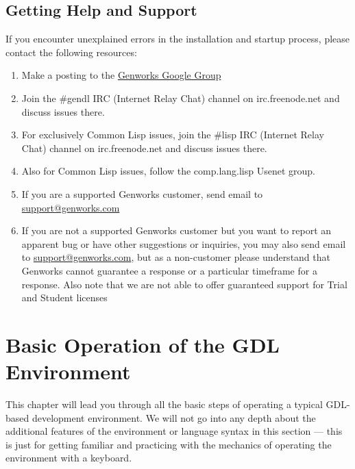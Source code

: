 \documentclass [11pt]{book}
\begin{document}
\section{Getting Help and Support}

\label{sec:gettinghelpandsupport}

If you encounter unexplained errors in the installation and
startup process, please contact the following resources:

\begin{enumerate}

\item Make a posting to the \href{http://groups.google.com/group/genworks}{Genworks Google Group}

\item Join the \#gendl IRC (Internet Relay Chat) channel on
	irc.freenode.net and discuss issues there.

\item For exclusively Common Lisp issues, join the \#lisp
	IRC (Internet Relay Chat) channel on irc.freenode.net and
	discuss issues there.

\item Also for Common Lisp issues, follow the comp.lang.lisp
	Usenet group.

\item If you are a supported Genworks customer, send email to \href{mailto:support@genworks.com}{support@genworks.com}

\item If you are not a supported Genworks customer but you want to report an apparent bug or have other suggestions or inquiries, you may also send email to \href{mailto:support@genworks.com}{support@genworks.com}, but as a non-customer please understand that Genworks
	  cannot guarantee a response or a particular timeframe for a
	  response. Also note that we are not able to offer guaranteed
	  support for Trial and Student licenses 

\end{enumerate}



\chapter{Basic Operation of the GDL Environment}

\label{chap:basicoperationofthegdlenvironment}

This chapter will lead you through all the basic steps of
operating a typical GDL-based development environment. We will not go
into any depth about the additional features of the environment or
language syntax in this section --- this is just for getting familiar
and practicing with the mechanics of operating the environment with a
keyboard.
\end{document}
